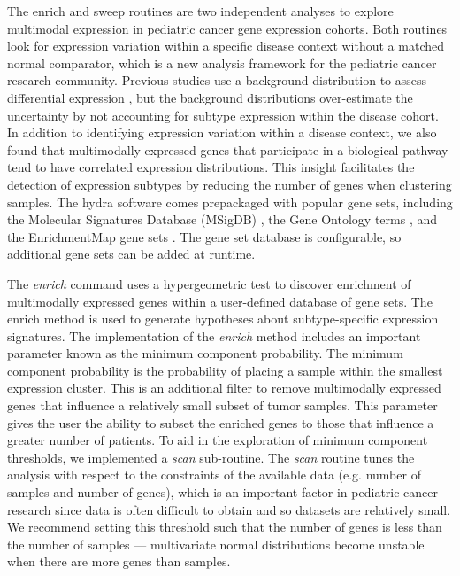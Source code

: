 \documentclass[10pt,letterpaper]{article}
\begin{document}
The enrich and sweep routines are two independent analyses to explore multimodal expression in pediatric cancer gene expression cohorts. Both routines look for expression variation within a specific disease context without a matched normal comparator, which is a new analysis framework for the pediatric cancer research community. Previous studies use a background distribution to assess differential expression \cite{modyIntegrativeClinicalSequencing2015, worstNextgenerationPersonalisedMedicine2016, obergImplementationNextGeneration2016}, but the background distributions over-estimate the uncertainty by not accounting for subtype expression within the disease cohort. In addition to identifying expression variation within a disease context, we also found that multimodally expressed genes that participate in a biological pathway tend to have correlated expression distributions. This insight facilitates the detection of expression subtypes by reducing the number of genes when clustering samples. The hydra software comes prepackaged with popular gene sets, including the Molecular Signatures Database (MSigDB) \cite{liberzonMolecularSignaturesDatabase2011}, the Gene Ontology terms \cite{ashburnerGeneOntologyTool2000, gene2018gene}, and the EnrichmentMap gene sets \cite{merico2010enrichment}. The gene set database is configurable, so additional gene sets can be added at runtime.

The \textit{enrich} command uses a hypergeometric test \cite{yuClusterProfilerPackageComparing2012} to discover enrichment of multimodally expressed genes within a user-defined database of gene sets. The enrich method is used to generate hypotheses about subtype-specific expression signatures. The implementation of the \textit{enrich} method includes an important parameter known as the minimum component probability. The minimum component probability is the probability of placing a sample within the smallest expression cluster. This is an additional filter to remove multimodally expressed genes that influence a relatively small subset of tumor samples. This parameter gives the user the ability to subset the enriched genes to those that influence a greater number of patients. To aid in the exploration of minimum component thresholds, we implemented a \textit{scan} sub-routine. The \textit{scan} routine tunes the analysis with respect to the constraints of the available data (e.g. number of samples and number of genes), which is an important factor in pediatric cancer research since data is often difficult to obtain and so datasets are relatively small. We recommend setting this threshold such that the number of genes is less than the number of samples --- multivariate normal distributions become unstable when there are more genes than samples. 
\end{document}
